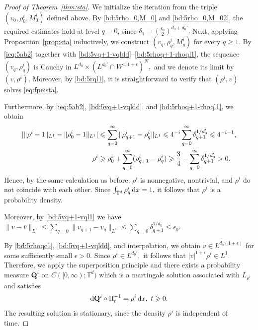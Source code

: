 \documentclass[UTF-8,reqno]{amsart}
\numberwithin{equation}{section}
\theoremstyle{definition}
\def\dif{{\mathord{{\rm d}}}}
\def\geq{\geqslant}
\def\leq{\leqslant}
\def\dif{{\mathord{{\rm d}}}}
\def\geq{\geqslant}
\def\leq{\leqslant}
\begin{document}
 \begin{proof}[Proof of Theorem~\ref{thm:sta}]
We initialize the iteration from the triple
$
(v_0,\rho^i_0,M^i_0)
$
defined above.
By \eqref{bd:5rho_0,M_0} and \eqref{bd:5rho_0,M_02}, the required estimates hold at level $q=0$, since
$
\delta_1=(\frac{\epsilon_0}{2})^{d_0+d_0'}.
$ 
Next, applying Proposition~\ref{prop:sta} inductively, we construct
$
(v_q,\rho^i_q,M^i_q)
$
for every
$
q\geq1.
$
By \eqref{ieq:5ab2} together with
\eqref{bd:5vq+1-vqldd}--\eqref{bd:5rhoq+1-rhoql1}, the sequence
$
 (v_q,\rho^i_q) 
$
is Cauchy in
$
L^{d_0}\times (L^{d_0'}\cap W^{1,1+\epsilon})^N,
$
and we denote its limit by
$
(v,\rho^i).
$
Moreover, by \eqref{bd:5rql1}, it is straightforward to verify that
$
(\rho^i,v)
$
solves \eqref{eq:fpe:sta}.

Furthermore, by \eqref{ieq:5ab2},
\eqref{bd:5vq+1-vqldd}, and
\eqref{bd:5rhoq+1-rhoql1}, we obtain
\begin{align}
|\|\rho^i-1\|_{L^1}-\|\rho^i_0-1\|_{L^1}|
&\leq
\sum_{q=0}^\infty
\|\rho^i_{q+1}-\rho^i_q\|_{L^1}
\leq
 4^{-i}\sum_{q=0}^\infty
\delta_{q+1}^{1/d_0'}\leq 4^{-i-1}
,
\notag\\
\rho^i
&\geq
\rho^i_0
+
\sum_{q=0}^\infty
(\rho^i_{q+1}-\rho^i_q)
\geq
\frac34
-
\sum_{q=0}^\infty
\delta_{q+1}^{1/d_0'}
>0.
\notag
\end{align}
Hence, by the same calculation as before, $\rho^i$ is nonnegative, nontrivial, and $\rho^i$
 do not coincide with each other.
Since
$
\int_{\mathbb{T}^d}\rho_q^i\,\dif x=1,
$
it follows that $\rho^i$ is a probability density.

Moreover, by \eqref{bd:5vq+1-vql1}  we have $  \|v -\overline v\|_{L^{1}}\leq\sum_{q=0}  \|v_{q+1}-v_{q}\|_{L^{1}}\leq \sum_{q=0}\delta_{q+1}^{1/d_0}
 \leq \epsilon_0. $ 

By \eqref{bd:5rhoqc1}, \eqref{bd:5vq+1-vqldd}, and interpolation, we obtain
$
v\in L^{d_0(1+\epsilon)}
$
for some sufficiently small
$
\epsilon>0.
$
Since
$
\rho^i\in L^{d_0'},
$
it follows that
$
|v|^{1+\epsilon}\rho^i\in L^1.
$
Therefore, we apply the superposition principle
\cite[Section~7.2]{Tre14}
 and there exists a probability measure
$
\mathbf{Q}^i
$
on
$
C([0,\infty);\mathbb{T}^d)
$
which is a martingale solution associated with $L_{\rho^i}$ and satisfies
\begin{align*}
\dif \mathbf{Q}^i\circ\Pi_t^{-1}
=
\rho^i\,\dif x,
\ 
t\geq0.
\end{align*}
The resulting solution is stationary, since the density $\rho^i$ is independent of time.
\end{proof}
\end{document}
